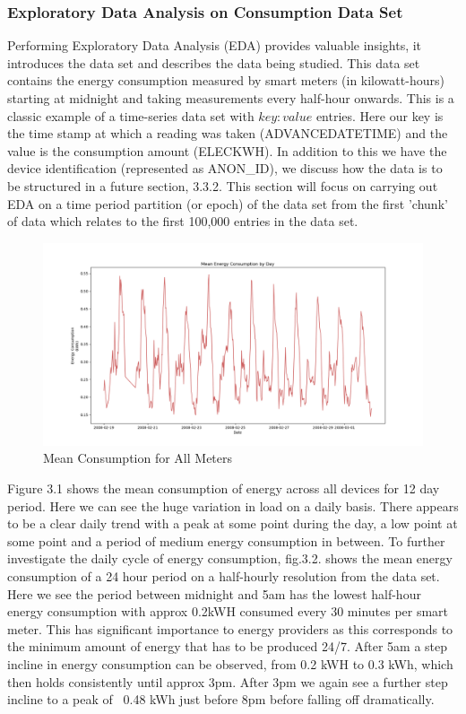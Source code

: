         \subsubsection{Exploratory Data Analysis on Consumption Data Set}
        Performing Exploratory Data Analysis (EDA) provides valuable insights, it introduces the data set and describes the data being studied. This data set contains the energy consumption measured by smart meters (in kilowatt-hours) starting at midnight and taking measurements every half-hour onwards. This is a classic example of a time-series data set with $key:value$ entries. Here our key is the time stamp at which a reading was taken (ADVANCEDATETIME) and the value is the consumption amount (ELECKWH). In addition to this we have the device identification (represented as ANON\_ID), we discuss how the data is to be structured in a future section, 3.3.2. This section will focus on carrying out EDA on a time period partition (or epoch) of the data set from the first 'chunk' of data which relates to the first 100,000 entries in the data set. 
        
        \begin{figure}[H]
        \centering     
        \includegraphics[width=1\textwidth]{Figures/EDA_images/mean_consumption_day.png}
        \caption{Mean Consumption for All Meters}
        \label{fig:Mean Consumption}
        \end{figure} 
        
        Figure 3.1 shows the mean consumption of energy across all devices for 12 day period.  Here we can see the huge variation in load on a daily basis. There appears to be a clear daily trend with a peak at some point during the day, a low point at some point and a period of medium energy consumption in between. To further investigate the daily cycle of energy consumption, fig.3.2. shows the mean energy consumption of a 24 hour period on a half-hourly resolution from the data set. Here we see the period between midnight and 5am has the lowest half-hour energy consumption with approx 0.2kWH consumed every 30 minutes per smart meter. This has significant importance to energy providers as this corresponds to the minimum amount of energy that has to be produced 24/7. After 5am a step incline in energy consumption can be observed, from 0.2 kWH to 0.3 kWh, which then holds consistently until approx 3pm. After 3pm we again see a further step incline to a peak of ~0.48 kWh just before 8pm before falling off dramatically.
        

